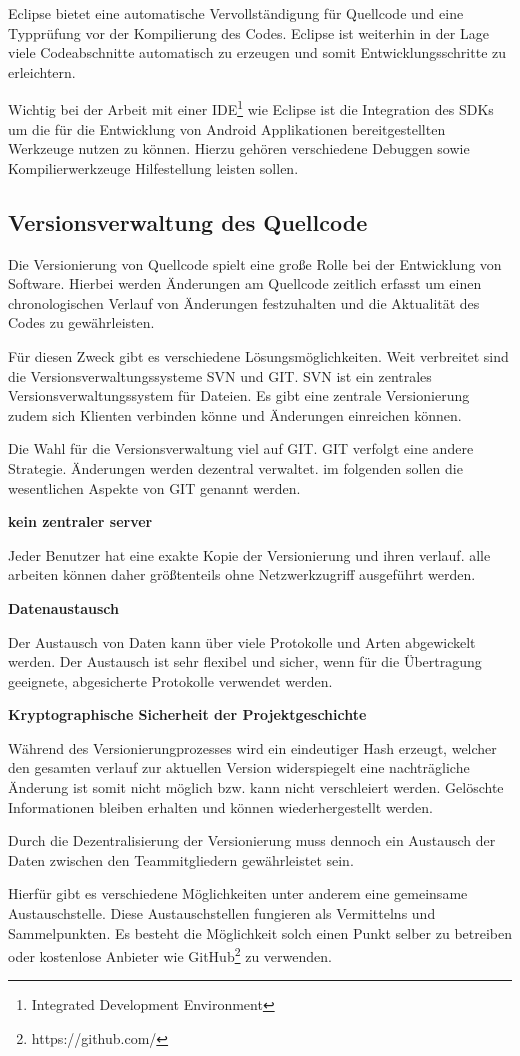 Eclipse bietet eine automatische Vervollständigung für Quellcode und eine Typprüfung vor der Kompilierung des Codes. Eclipse ist weiterhin in der Lage viele Codeabschnitte automatisch zu erzeugen und somit Entwicklungsschritte zu erleichtern.

Wichtig bei der Arbeit mit einer IDE\footnote{Integrated Development Environment} wie Eclipse ist die Integration des SDKs um die für die Entwicklung von Android Applikationen bereitgestellten Werkzeuge nutzen zu können. Hierzu gehören verschiedene Debuggen sowie Kompilierwerkzeuge Hilfestellung leisten sollen.

\subsection{Versionsverwaltung des Quellcode}
Die Versionierung von Quellcode spielt eine große Rolle bei der Entwicklung von Software. Hierbei werden Änderungen am Quellcode zeitlich erfasst um einen chronologischen Verlauf von Änderungen festzuhalten und die Aktualität des Codes zu gewährleisten.

Für diesen Zweck gibt es verschiedene Lösungsmöglichkeiten. Weit verbreitet sind die Versionsverwaltungssysteme SVN und GIT.
SVN ist ein zentrales Versionsverwaltungssystem für Dateien. Es gibt eine zentrale Versionierung zudem sich Klienten verbinden könne und Änderungen einreichen können.

Die Wahl für die Versionsverwaltung viel auf GIT. GIT verfolgt eine andere Strategie. Änderungen werden dezentral verwaltet. im folgenden sollen die wesentlichen Aspekte von GIT genannt werden.

\textbf{kein zentraler server}

Jeder Benutzer hat eine exakte Kopie der Versionierung und ihren verlauf. alle arbeiten können daher größtenteils ohne Netzwerkzugriff ausgeführt werden.

\textbf{Datenaustausch}

Der Austausch von Daten kann über viele Protokolle und Arten abgewickelt werden. Der Austausch ist sehr flexibel und sicher, wenn für die Übertragung geeignete, abgesicherte Protokolle verwendet werden.


\textbf{Kryptographische Sicherheit der Projektgeschichte}

Während des Versionierungprozesses wird ein eindeutiger Hash erzeugt, welcher den gesamten verlauf zur aktuellen Version widerspiegelt eine nachträgliche Änderung ist somit nicht möglich bzw. kann nicht verschleiert werden. Gelöschte Informationen bleiben erhalten und können wiederhergestellt werden.

Durch die Dezentralisierung der Versionierung muss dennoch ein Austausch der Daten zwischen den Teammitgliedern gewährleistet sein.

Hierfür gibt es verschiedene Möglichkeiten unter anderem eine gemeinsame Austauschstelle. Diese Austauschstellen fungieren als Vermittelns und Sammelpunkten. Es besteht die Möglichkeit solch einen Punkt selber zu betreiben oder kostenlose Anbieter wie GitHub\footnote{https://github.com/} zu verwenden.

